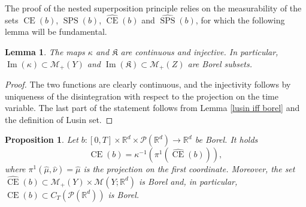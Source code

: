 \documentclass[10pt,leqno]{amsart}
\numberwithin{equation}{section}
\newtheorem{prop}[teorema]{Proposition}
\newtheorem{lemma}[teorema]{Lemma}
\newcommand{\R}{\mathbb{R}}
\newcommand{\PP}{\mathcal{P}}
\newcommand{\CE}{\operatorname{CE}}
\begin{document}
The proof of the nested superposition principle relies on the measurability of the sets $\CE(b)$, $\operatorname{SPS}(b)$, $\hat{\CE}(b)$ and $\hat{\operatorname{SPS}}(b)$, for which the following lemma will be fundamental.

\begin{lemma}\label{cont of kappa and mathfrak k}
    The maps $\kappa$ and $\mathfrak{K}$ are continuous and injective. In particular, $\operatorname{Im}(\kappa)\subset \mathcal{M}_+(Y)$ and $\operatorname{Im}(\mathfrak{K})\subset \mathcal{M}_+(Z)$ are Borel subsets.
\end{lemma}

\begin{proof}
    The two functions are clearly continuous, and the injectivity follows by uniqueness of the disintegration with respect to the projection on the time variable. The last part of the statement follows from Lemma \ref{lusin iff borel} and the definition of Lusin set.
\end{proof}

\begin{prop}\label{meas of CE_b}
    Let $b:[0,T]\times \R^d \times \PP(\R^d) \to \R^d$ be Borel. 
    It holds 
    \begin{equation}\label{eq: CE(b) = kappa^-1 hat CE(b)}
        \operatorname{CE}(b) = \kappa^{-1}(\pi^1(\hat{\CE}(b))),
    \end{equation} 
    where $\pi^1(\hat{\mu},\hat{\nu}) = \hat{\mu}$ is the projection on the first coordinate.
    Moreover, the set $\hat{\CE}(b) \subset \mathcal{M}_+(Y)\times \mathcal{M}(Y;\R^d)$ is Borel and, in particular, $\operatorname{CE}(b)\subset C_T(\PP(\R^d))$ is Borel. 
\end{prop}
\end{document}
